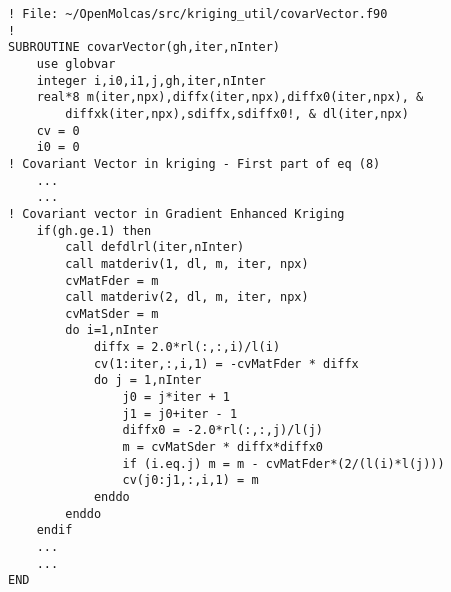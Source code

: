 \documentclass[aps,prb,twocolumn,superscriptaddress,floatfix,longbibliography,10pt]{revtex4-2}
\begin{document}
\begin{lstlisting}[caption={(Code: 11)}, title={Code:11. Gradient of GEK}, label=code.ggek]
! File: ~/OpenMolcas/src/kriging_util/covarVector.f90
!
SUBROUTINE covarVector(gh,iter,nInter)
    use globvar
    integer i,i0,i1,j,gh,iter,nInter
    real*8 m(iter,npx),diffx(iter,npx),diffx0(iter,npx), &
        diffxk(iter,npx),sdiffx,sdiffx0!, & dl(iter,npx)
    cv = 0
    i0 = 0
! Covariant Vector in kriging - First part of eq (8)
	...
	...
! Covariant vector in Gradient Enhanced Kriging
    if(gh.ge.1) then
        call defdlrl(iter,nInter)
        call matderiv(1, dl, m, iter, npx)
        cvMatFder = m
        call matderiv(2, dl, m, iter, npx)
        cvMatSder = m
        do i=1,nInter
            diffx = 2.0*rl(:,:,i)/l(i)
            cv(1:iter,:,i,1) = -cvMatFder * diffx
            do j = 1,nInter
                j0 = j*iter + 1
                j1 = j0+iter - 1
                diffx0 = -2.0*rl(:,:,j)/l(j)
                m = cvMatSder * diffx*diffx0
                if (i.eq.j) m = m - cvMatFder*(2/(l(i)*l(j)))
                cv(j0:j1,:,i,1) = m
            enddo
        enddo
    endif
    ...
    ...
END
\end{lstlisting}
\end{document}
